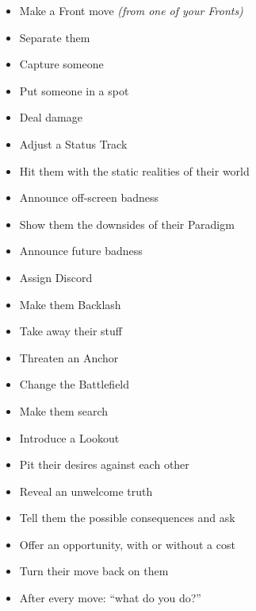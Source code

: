 \documentclass[letterpaper,10pt]{article}
\newcommand{\SECTION}[1]{\vspace{.5em}{\noindent\titlefont\LARGE\textbf{#1}}

}
\begin{document}
\SECTION{Your Moves}
\begin{itemize}
\item Make a Front move \textit{(from one of your Fronts)}
\item Separate them
\item Capture someone
\item Put someone in a spot
\item Deal damage
\item Adjust a Status Track
\item Hit them with the static realities of their world
\item Announce off-screen badness
\item Show them the downsides of their Paradigm
\item Announce future badness
\item Assign Discord
\item Make them Backlash
\item Take away their stuff
\item Threaten an Anchor
\item Change the Battlefield
\item Make them search
\item Introduce a Lookout
\item Pit their desires against each other
\item Reveal an unwelcome truth
\item Tell them the possible consequences and ask
\item Offer an opportunity, with or without a cost
\item Turn their move back on them
\item After every move: ``what do you do?''
\end{itemize}
\end{document}

